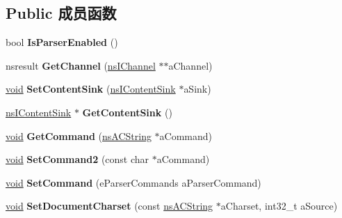 \subsection*{Public 成员函数}
\begin{DoxyCompactItemize}
\item 
\mbox{\label{interfacens_i_parser_a78bbdf6c472ed720bab60d44b6f8dbfa}} 
bool {\bfseries Is\+Parser\+Enabled} ()
\item 
\mbox{\label{interfacens_i_parser_aed13e271b0c42b3d7aa8eaeb5c5d76d9}} 
nsresult {\bfseries Get\+Channel} (\hyperlink{interfacens_i_channel}{ns\+I\+Channel} $\ast$$\ast$a\+Channel)
\item 
\mbox{\label{interfacens_i_parser_adfdcd90f846217c82b6e5ff4ea4478d9}} 
\hyperlink{interfacevoid}{void} {\bfseries Set\+Content\+Sink} (\hyperlink{interfacens_i_supports}{ns\+I\+Content\+Sink} $\ast$a\+Sink)
\item 
\mbox{\label{interfacens_i_parser_ad6ec7a68287a52ff5d27aab1cd10ab50}} 
\hyperlink{interfacens_i_supports}{ns\+I\+Content\+Sink} $\ast$ {\bfseries Get\+Content\+Sink} ()
\item 
\mbox{\label{interfacens_i_parser_ab007b91264f43b74d647a694aecc61cc}} 
\hyperlink{interfacevoid}{void} {\bfseries Get\+Command} (\hyperlink{structns_c_string_container}{ns\+A\+C\+String} $\ast$a\+Command)
\item 
\mbox{\label{interfacens_i_parser_a0957aae413d7d15c85e7563743219d29}} 
\hyperlink{interfacevoid}{void} {\bfseries Set\+Command2} (const char $\ast$a\+Command)
\item 
\mbox{\label{interfacens_i_parser_adb4d14fe51077df28430c9f802444cc2}} 
\hyperlink{interfacevoid}{void} {\bfseries Set\+Command} (e\+Parser\+Commands a\+Parser\+Command)
\item 
\mbox{\label{interfacens_i_parser_a4e2c1701f84bb6d1001faea57f5121a7}} 
\hyperlink{interfacevoid}{void} {\bfseries Set\+Document\+Charset} (const \hyperlink{structns_c_string_container}{ns\+A\+C\+String} $\ast$a\+Charset, int32\+\_\+t a\+Source)
$$
\end{DoxyCompactItemize}
